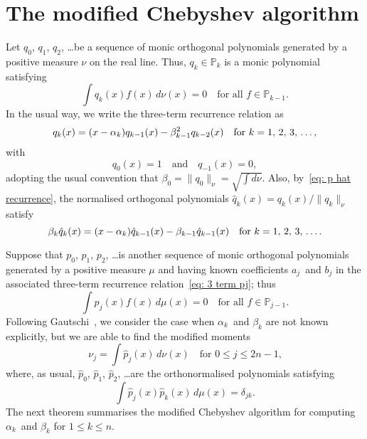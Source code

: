 \documentclass[12pt,a4paper]{article}
\newcommand{\Poly}{\mathbb{P}}
\begin{document}
\section{The modified Chebyshev algorithm}

Let $q_0$, $q_1$, $q_2$, \dots be a sequence of monic orthogonal 
polynomials generated by a positive measure $\nu$ on the real line.  
Thus, $q_k\in\Poly_k$ is a monic polynomial satisfying 
\[
\int q_k(x)f(x)\,d\nu(x)=0\quad\text{for all $f\in\Poly_{k-1}$.}
\]
In the usual way, we write the three-term recurrence relation as
\begin{equation}\label{eq: 3 term q}
q_k(x)=(x-\alpha_k)q_{k-1}(x)-\beta_{k-1}^2 q_{k-2}(x)
	\quad\text{for $k=1$, $2$, $3$, \dots,}
\end{equation}
with
\[
q_0(x)=1\quad\text{and}\quad q_{-1}(x)=0,
\]
adopting the usual convention that $\beta_0=\|q_0\|_\nu=\sqrt{\int d\nu}$.  
Also, by~\eqref{eq: p hat recurrence}, the normalised orthogonal polynomials
$\hat q_k(x)=q_k(x)/\|q_k\|_\nu$ satisfy
\begin{equation}\label{eq: q hat recurrence}
\beta_k\hat q_k(x)=(x-\alpha_k)\hat q_{k-1}(x)-\beta_{k-1}\hat q_{k-1}(x)
\quad\text{for $k=1$, $2$, $3$, \dots.}
\end{equation}

Suppose that $p_0$, $p_1$, $p_2$, \dots is another sequence of monic 
orthogonal polynomials generated by a positive measure $\mu$ and 
having known coefficients $a_j$~and $b_j$ in the associated 
three-term recurrence relation~\eqref{eq: 3 term pj}; thus
\[
\int p_j(x)f(x)\,d\mu(x)=0\quad\text{for all $f\in\Poly_{j-1}$.}
\]
Following Gautschi~\cite{Gautschi1982}, we consider the case when 
$\alpha_k$~and $\beta_k$ are not known explicitly, but we are able to 
find the modified moments
\[
\nu_j=\int\hat p_j(x)\,d\nu(x)\quad\text{for $0\le j\le 2n-1$,}
\]
where, as usual, $\hat p_0$, $\hat p_1$, $\hat p_2$, \dots are the 
orthonormalised polynomials satisfying
\[
\int\hat p_j(x)\hat p_k(x)\,d\mu(x)=\delta_{jk}.
\]
The next theorem summarises the modified Chebyshev algorithm for 
computing $\alpha_k$~and $\beta_k$ for $1\le k\le n$.
\end{document}
